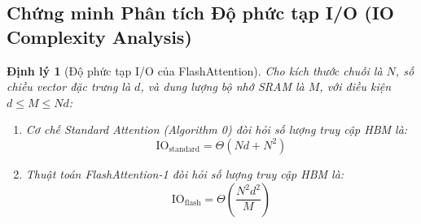 \documentclass[10pt,a4paper]{article}
\newtheorem{theorem}{Định lý}
\begin{document}
\subsection{Chứng minh Phân tích Độ phức tạp I/O (IO Complexity Analysis)}
\label{subsec:iocomplexity}

\begin{theorem}[Độ phức tạp I/O của FlashAttention]
\label{thm:io_complexity}
Cho kích thước chuỗi là $N$, số chiều vector đặc trưng là $d$, và dung lượng bộ nhớ SRAM là $M$, với điều kiện $d \le M \le Nd$:
\begin{enumerate}
    \item Cơ chế Standard Attention (Algorithm 0) đòi hỏi số lượng truy cập HBM là:
    \begin{equation}
    \text{IO}_{\text{standard}} = \Theta\left(Nd + N^2\right)
    \end{equation}
    \item Thuật toán FlashAttention-1 đòi hỏi số lượng truy cập HBM là:
    \begin{equation}
    \text{IO}_{\text{flash}} = \Theta\left(\frac{N^2 d^2}{M}\right)
    \end{equation}
\end{enumerate}
\end{theorem}
\end{document}
